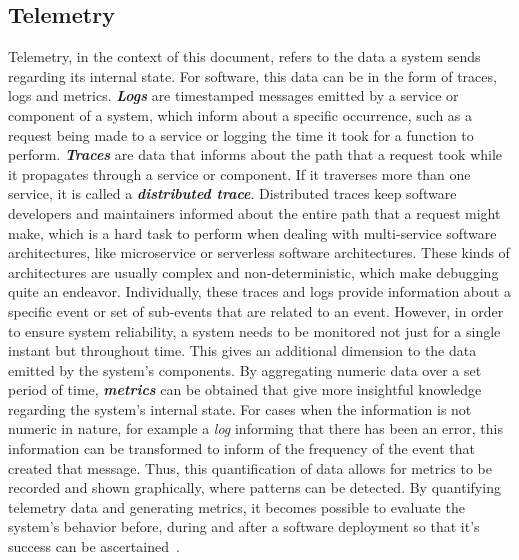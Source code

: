 \subsection{Telemetry}\label{state-of-the-art:ss:telemetry}

Telemetry, in the context of this document, refers to the data a system sends regarding its internal state. For software, this data can be in the form of traces, logs and metrics.
\textbf{\textit{Logs}} are timestamped messages emitted by a service or component of a system, which inform about a specific occurrence, such as a request being made to a service or logging the time it took for a function to perform.
\textbf{\textit{Traces}} are data that informs about the path that a request took while it propagates through a service or component. If it traverses more than one service, it is called a \textbf{\textit{distributed trace}}. Distributed traces keep software developers and maintainers informed about the entire path that a request might make, which is a hard task to perform when dealing with multi-service software architectures, like microservice or serverless software architectures. These kinds of architectures are usually complex and non-deterministic, which make debugging quite an endeavor. Individually, these traces and logs provide information about a specific event or set of sub-events that are related to an event. However, in order to ensure system reliability, a system needs to be monitored not just for a single instant but throughout time. This gives an additional dimension to the data emitted by the system's components. By aggregating numeric data over a set period of time, \textbf{\textit{metrics}} can be obtained that give more insightful knowledge regarding the system's internal state. For cases when the information is not numeric in nature, for example a \textit{log} informing that there has been an error, this information can be transformed to inform of the frequency of the event that created that message. Thus, this quantification of data allows for metrics to be recorded and shown graphically, where patterns can be detected. By quantifying telemetry data and generating metrics, it becomes possible to evaluate the system's behavior before, during and after a software deployment so that it's success can be ascertained~\Parencite{mills1988software}.
